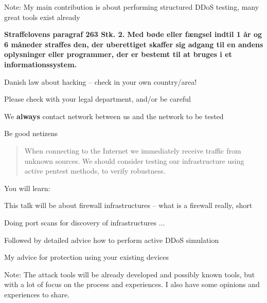 \documentclass[Screen16to9,17pt]{foils}
\begin{document}
{}

{\small
Note: My main contribution is about performing structured DDoS testing, many great tools exist already}

\hlkprofiluk



{\bfseries Straffelovens paragraf 263 Stk. 2. Med bøde eller fængsel indtil 1 år og 6 måneder straffes den, der uberettiget skaffer sig adgang til en andens oplysninger eller programmer, der er bestemt til at bruges i et informationssystem. }

\begin{list2}
\item Danish law about hacking -- check in your own country/area!
\item Please check with your legal department, and/or be careful
\item We {\bf always} contact network between us and the network to be tested
\item Be good netizens
\end{list2}



\begin{quote}
When connecting to the Internet we immediately receive traffic from unknown sources. We should consider testing our infrastructure using active pentest methods, to verify robustness.
\end{quote}


You will learn:
\begin{list2}
\item This talk will be about firewall infrastructures -- what is a firewall really, short
\item Doing port scans for discovery of infrastructures ...
\item Followed by detailed advice how to perform active DDoS simulation
\item My advice for protection using your existing devices
\end{list2}

Note: The attack tools will be already developed and possibly known tools, but with a lot of focus on the process and experiences. I also have some opinions and experiences to share.


\end{document}

